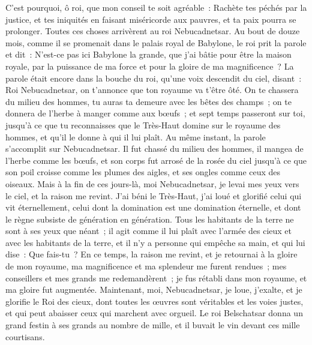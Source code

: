 \begin{multicols}{2}
C'est pourquoi, ô roi, que mon conseil te soit agréable~: Rachète tes péchés par la justice, et tes iniquités en faisant miséricorde aux pauvres, et ta paix pourra se prolonger.
Toutes ces choses arrivèrent au roi Nebucadnetsar.
Au bout de douze mois, comme il se promenait dans le palais royal de Babylone,
le roi prit la parole et dit~: N'est-ce pas ici Babylone la grande, que j'ai bâtie pour être la maison royale, par la puissance de ma force et pour la gloire de ma magnificence~?
La parole était encore dans la bouche du roi, qu'une voix descendit du ciel, disant~: Roi Nebucadnetsar, on t'annonce que ton royaume va t'être ôté.
On te chassera du milieu des hommes, tu auras ta demeure avec les bêtes des champs~; on te donnera de l'herbe à manger comme aux bœufs~; et sept temps passeront sur toi, jusqu'à ce que tu reconnaisses que le Très-Haut domine sur le royaume des hommes, et qu'il le donne à qui il lui plaît.
Au même instant, la parole s'accomplit sur Nebucadnetsar. Il fut chassé du milieu des hommes, il mangea de l'herbe comme les bœufs, et son corps fut arrosé de la rosée du ciel jusqu'à ce que son poil croisse comme les plumes des aigles, et ses ongles comme ceux des oiseaux.
Mais à la fin de ces jours-là, moi Nebucadnetsar, je levai mes yeux vers le ciel, et la raison me revint. J'ai béni le Très-Haut, j'ai loué et glorifié celui qui vit éternellement, celui dont la domination est une domination éternelle, et dont le règne subsiste de génération en génération.
Tous les habitants de la terre ne sont à ses yeux que néant~; il agit comme il lui plaît avec l'armée des cieux et avec les habitants de la terre, et il n'y a personne qui empêche sa main, et qui lui dise~: Que fais-tu~?
En ce temps, la raison me revint, et je retournai à la gloire de mon royaume, ma magnificence et ma splendeur me furent rendues~; mes conseillers et mes grands me redemandèrent~; je fus rétabli dans mon royaume, et ma gloire fut augmentée.
Maintenant, moi, Nebucadnetsar, je loue, j'exalte, et je glorifie le Roi des cieux, dont toutes les œuvres sont véritables et les voies justes, et qui peut abaisser ceux qui marchent avec orgueil.
\VerseOne{}Le roi Belschatsar donna un grand festin à ses grands au nombre de mille, et il buvait le vin devant ces mille courtisans.

\end{multicols}
